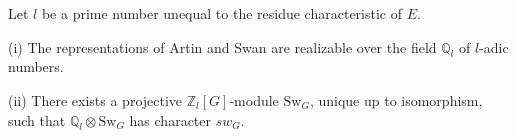 Let $l$ be a prime number unequal to the residue characteristic of $E$.

(i) The representations of Artin and Swan are realizable over the field $\mathbb{Q}_l$ of $l$-adic numbers.

(ii) There exists a projective $\mathbb{Z}_l[G]$-module $\mathrm{Sw}_G$, unique up to isomorphism, such that $\mathbb{Q}_l \otimes \mathrm{Sw}_G$ has character $sw_G$.
